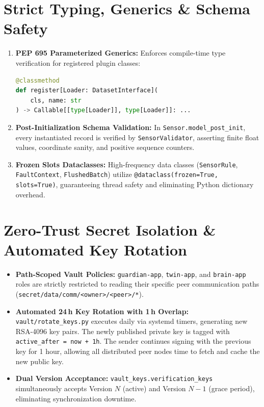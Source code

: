 \documentclass[10pt,a4paper]{report}
\begin{document}
\section{Strict Typing, Generics \& Schema Safety}
\begin{enumerate}
  \item \textbf{PEP 695 Parameterized Generics:} Enforces compile-time type verification for registered plugin classes:
  \begin{lstlisting}[language=Python]
@classmethod
def register[Loader: DatasetInterface](
    cls, name: str
) -> Callable[[type[Loader]], type[Loader]]: ...
  \end{lstlisting}
  \item \textbf{Post-Initialization Schema Validation:} In \lstinline{Sensor.model_post_init}, every instantiated record is verified by \texttt{SensorValidator}, asserting finite float values, coordinate sanity, and positive sequence counters.
  \item \textbf{Frozen Slots Dataclasses:} High-frequency data classes (\texttt{SensorRule}, \texttt{FaultContext}, \texttt{FlushedBatch}) utilize \lstinline{@dataclass(frozen=True, slots=True)}, guaranteeing thread safety and eliminating Python dictionary overhead.
\end{enumerate}

\section{Zero-Trust Secret Isolation \& Automated Key Rotation}
\begin{itemize}[leftmargin=*]
  \item \textbf{Path-Scoped Vault Policies:} \texttt{guardian-app}, \texttt{twin-app}, and \texttt{brain-app} roles are strictly restricted to reading their specific peer communication paths (\texttt{secret/data/comm/<owner>/<peer>/*}).
  \item \textbf{Automated 24\,h Key Rotation with 1\,h Overlap:} \texttt{vault/rotate\_keys.py} executes daily via systemd timers, generating new RSA-4096 key pairs. The newly published private key is tagged with \lstinline{active_after = now + 1h}. The sender continues signing with the previous key for 1 hour, allowing all distributed peer nodes time to fetch and cache the new public key.
  \item \textbf{Dual Version Acceptance:} \lstinline{vault_keys.verification_keys} simultaneously accepts Version $N$ (active) and Version $N-1$ (grace period), eliminating synchronization downtime.
\end{itemize}
\end{document}
